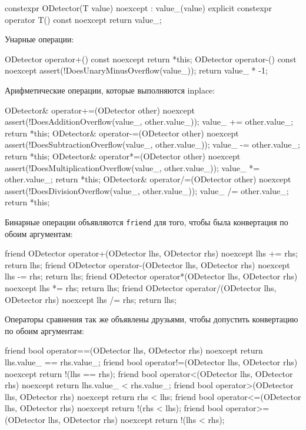 \begin{cppcode}
constexpr ODetector(T value) noexcept : value_(value) {}
explicit constexpr operator T() const noexcept {
  return value_;
}
\end{cppcode}
Унарные операции:
\begin{cppcode}
ODetector operator+() const noexcept {
  return *this;
}
ODetector operator-() const noexcept {
  assert(!DoesUnaryMinusOverflow(value_));
  return value_ * -1;
}
\end{cppcode}
Арифметические операции, которые выполняются inplace:
\begin{cppcode}
ODetector& operator+=(ODetector other) noexcept {
  assert(!DoesAdditionOverflow(value_, other.value_));
  value_ += other.value_;
  return *this;
}
ODetector& operator-=(ODetector other) noexcept {
  assert(!DoesSubtractionOverflow(value_, other.value_));
  value_ -= other.value_;
  return *this;
}
ODetector& operator*=(ODetector other) noexcept {
  assert(!DoesMultiplicationOverflow(value_, other.value_));
  value_ *= other.value_;
  return *this;
}
ODetector& operator/=(ODetector other) noexcept {
  assert(!DoesDivisionOverflow(value_, other.value_));
  value_ /= other.value_;
  return *this;
}
\end{cppcode}
Бинарные операции объявляются \verb"friend" для того, чтобы была конвертация по обоим аргументам:
\begin{cppcode}
friend ODetector operator+(ODetector lhs, ODetector rhs) noexcept {
  lhs += rhs;
  return lhs;
}
friend ODetector operator-(ODetector lhs, ODetector rhs) noexcept {
  lhs -= rhs;
  return lhs;
}
friend ODetector operator*(ODetector lhs, ODetector rhs) noexcept {
  lhs *= rhs;
  return lhs;
}
friend ODetector operator/(ODetector lhs, ODetector rhs) noexcept {
  lhs /= rhs;
  return lhs;
}
\end{cppcode}
Операторы сравнения так же объявлены друзьями, чтобы допустить конвертацию по обоим аргументам:
\begin{cppcode}
friend bool operator==(ODetector lhs, ODetector rhs) noexcept {
  return lhs.value_ == rhs.value_;
}
friend bool operator!=(ODetector lhs, ODetector rhs) noexcept {
  return !(lhs == rhs);
}
friend bool operator<(ODetector lhs, ODetector rhs) noexcept {
  return lhs.value_ < rhs.value_;
}
 friend bool operator>(ODetector lhs, ODetector rhs) noexcept {
  return rhs < lhs;
}
friend bool operator<=(ODetector lhs, ODetector rhs) noexcept {
  return !(rhs < lhs);
}
friend bool operator>=(ODetector lhs, ODetector rhs) noexcept {
  return !(lhs < rhs);
}
\end{cppcode}
